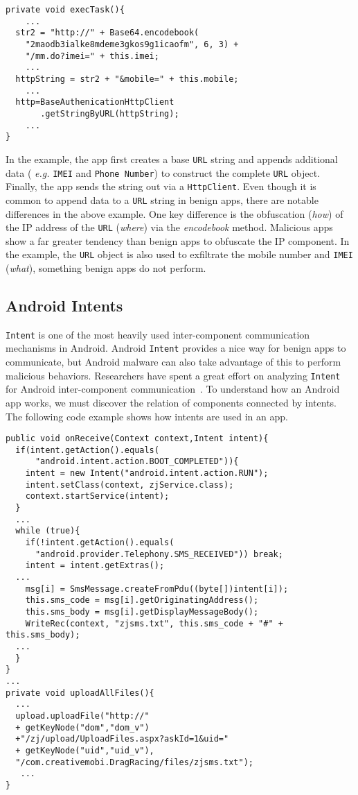\begin{lstlisting}[caption={Android URL Construction Example}, label={urlexample}]
private void execTask(){
    ...
  str2 = "http://" + Base64.encodebook(
    "2maodb3ialke8mdeme3gkos9g1icaofm", 6, 3) +
    "/mm.do?imei=" + this.imei;
    ...
  httpString = str2 + "&mobile=" + this.mobile;
    ...
  http=BaseAuthenicationHttpClient
       .getStringByURL(httpString);
    ...
}
\end{lstlisting}

In the example, the app first creates a base \texttt{URL} string and appends additional
data ( {\em e.g.} \texttt{IMEI} and \texttt{Phone Number}) to construct the complete \texttt{URL} object.
Finally, the app sends the string out via a \texttt{HttpClient}. Even though it is common to append data
to a \texttt{URL} string in benign apps, there are notable differences in the above example.
One key difference is the obfuscation ({\em how}) of the IP address of the \texttt{URL} ({\em where}) via the {\em encodebook} method.
Malicious apps show a far greater tendency than benign apps to obfuscate the IP component.
In the example, the \texttt{URL} object is also used to exfiltrate the mobile number and \texttt{IMEI} ({\em what}), something benign apps
do not perform.

\subsection{Android Intents}
\texttt{Intent} is one of the most heavily used inter-component communication mechanisms in Android.
Android \texttt{Intent} provides a nice way for benign apps to communicate, but Android malware
can also take advantage of this to perform malicious behaviors.
Researchers have spent a great effort on analyzing \texttt{Intent} for Android inter-component communication~\cite{Octeau:2013:EIC:2534766.2534813}.
To understand how an Android app works, we must discover the relation of components connected by intents.
The following code example shows how intents are used in an app.\\

\begin{lstlisting}[caption={Android System Intent Example}, label=systemintent]
public void onReceive(Context context,Intent intent){
  if(intent.getAction().equals(
      "android.intent.action.BOOT_COMPLETED")){
    intent = new Intent("android.intent.action.RUN");
    intent.setClass(context, zjService.class);
    context.startService(intent);
  }
  ...
  while (true){
    if(!intent.getAction().equals(
      "android.provider.Telephony.SMS_RECEIVED")) break;
    intent = intent.getExtras();
  ...
    msg[i] = SmsMessage.createFromPdu((byte[])intent[i]);
    this.sms_code = msg[i].getOriginatingAddress();
    this.sms_body = msg[i].getDisplayMessageBody();
    WriteRec(context, "zjsms.txt", this.sms_code + "#" + this.sms_body);
  ...
  }
}
...
private void uploadAllFiles(){
  ...
  upload.uploadFile("http://" 
  + getKeyNode("dom","dom_v")
  +"/zj/upload/UploadFiles.aspx?askId=1&uid="
  + getKeyNode("uid","uid_v"),
  "/com.creativemobi.DragRacing/files/zjsms.txt");
   ...
}
\end{lstlisting}

